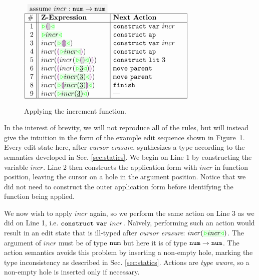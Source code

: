\begin{figure}
  \label{ex2}
\begin{center}
$\arraycolsep=4px
\begin{array}{|r||l|l|}
\multicolumn{2}{c}{\colorbox{light-gray}{assume $incr : \tarr{\tnum}{\tnum}$}}
\\
\hline
\# & \textbf{Z-Expression} &
\textbf{Next Action} 
\\
\hline
1 &
\zwsel{\hhole{}} &
\aConstruct{\fvar{incr}} \hphantom{~\,\,~~}
\\ 2 &
\zwsel{incr} &
\aConstruct{\fap}
\\ 3 &
incr(\zwsel{\hhole{}}) &
\aConstruct{\fvar{incr}}
\\ 4 &
incr(\hhole{\zwsel{incr}}) &
\aConstruct{\fap}
\\ 5 &
incr(\hhole{incr(\zwsel{\hhole{}})}) \hphantom{~~~~} &
\aConstruct{\fnumlit{3}}
\\ 6 &
incr(\hhole{incr(\zwsel{\hnum{3}})}) &
\aMove{\dParent}
\\ 7 &
incr(\hhole{\zwsel{incr(\hnum{3})}}) &
\aMove{\dParent}
\\ 8 &
incr(\zwsel{\hhole{incr(\hnum{3})}})&
\aFinish
\\ 9 &
incr(\zwsel{incr(\hnum{3})}) &
\textrm{---}
\\ \hline
\end{array}
$\end{center}
\caption{Applying the increment function.}
\label{fig:second-example}
\end{figure}
In the interest of brevity, we will not reproduce all of the rules, but will
instead give the intuition in the form of the example edit
sequence shown in Figure~\ref{fig:second-example}. Every edit state here, after \emph{cursor erasure}, synthesizes a type according
to the semantics developed in Sec. \ref{sec:statics}. 
We begin on Line 1 by constructing the variable $incr$. Line 2 then
constructs the application form with $incr$ in function position, leaving
the cursor on a hole in the argument position. Notice that we did not need
to construct the outer application form before identifying the function
being applied. 

%
We now wish to apply $incr$ again, so we perform the same action on Line 3
as we did on Line 1, i.e. $\mathtt{construct}~\mathtt{var}~incr$. Na\"ively, performing such an action would result in an 
edit state that is ill-typed after \emph{cursor erasure}:
$incr(\zwsel{incr})$. 
The argument of
$incr$ must be of type $\texttt{num}$ but here it is of type
$\texttt{num} \rightarrow \texttt{num}$. The action semantics avoids this problem by inserting a non-empty hole, marking the type inconsistency as described in Sec. \ref{sec:statics}. Actions are \emph{type aware}, so a non-empty hole is inserted only if necessary.

